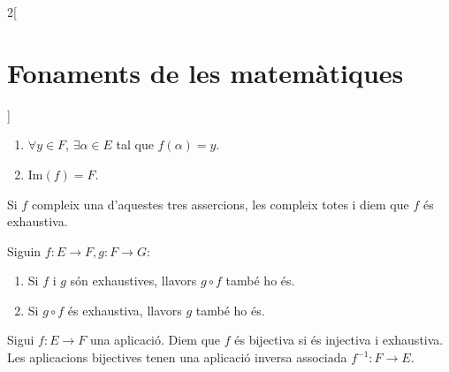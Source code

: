 \documentclass[class=article,10pt,crop=false]{standalone}
\begin{document}
\begin{multicols}{2}[\section{Fonaments de les matemàtiques}]
\begin{definition}
\begin{enumerate}
    \item $\forall y\in F$, $\exists\alpha\in E$ tal que $f(\alpha)=y$.
    \item $\text{Im}(f)=F$.
\end{enumerate}
Si $f$ compleix una d'aquestes tres assercions, les compleix totes i diem que $f$ és exhaustiva.
\end{definition}
\begin{prop}
Siguin $f:E\rightarrow F,g:F\rightarrow G$:
\begin{enumerate}
    \item Si $f$ i $g$ són exhaustives, llavors $g\circ f$ també ho és.
    \item Si $g\circ f$ és exhaustiva, llavors $g$ també ho és.
\end{enumerate}
\end{prop}
\begin{definition}
Sigui $f:E\rightarrow F$ una aplicació. Diem que $f$ és bijectiva si és injectiva i exhaustiva. Les aplicacions bijectives tenen una aplicació inversa associada $f^{-1}:F\rightarrow E$.
\end{definition}

\end{multicols}
\end{document}
